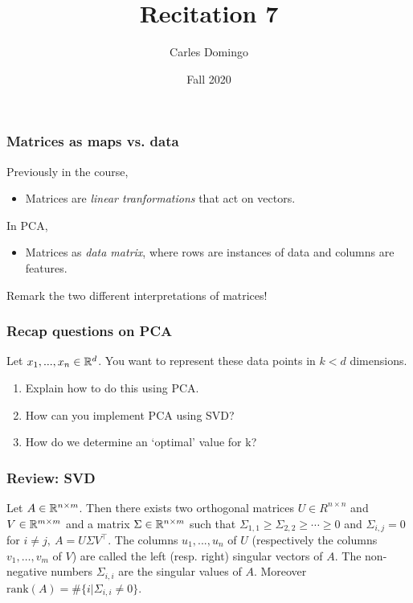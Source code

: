 \documentclass{beamer}
\title{Recitation 7}
\author{Carles Domingo}
\date{Fall 2020}
\begin{document}
\frame{\titlepage} 

\setcounter{showProgressBar}{0}
\setcounter{showSlideNumbers}{1}

\begin{frame}[t]
\frametitle{Matrices as maps vs. data}
Previously in the course,
\begin{itemize}
\item Matrices are \textit{linear tranformations} that act on vectors.
\end{itemize}
In PCA,
\begin{itemize}
\item Matrices as \textit{data matrix}, where rows are instances of data and columns are features.
\end{itemize}
Remark the two different interpretations of matrices!
\end{frame}

\begin{frame}[t]
\frametitle{Recap questions on PCA}
\vspace{-5pt}
Let $x_1,...,x_n\in\mathbb{R}^d$. You want to represent these data points in $k < d$ dimensions.
\begin{enumerate}
\item Explain how to do this using PCA.
\item How can you implement PCA using SVD?
\item How do we determine an `optimal' value for k?
\pause
\pause
\pause
\end{enumerate}
\end{frame}

\begin{frame}[t]
\frametitle{Review: SVD}
\begin{theorem}
Let $A \in \mathbb{R}^{n \times m}$. Then there exists two orthogonal matrices $U \in R^{n \times n}$ and $V \in \mathbb{R}^{m \times m}$ and a
matrix $\Sigma \in \mathbb{R}^{n \times m}$ such that $\Sigma_{1,1} \geq \Sigma_{2,2} \geq \cdots \geq 0$ and $\Sigma_{i,j} =0$ for $i \neq j, \ A = U \Sigma V^{\top}$.
The columns $u_1,...,u_n$ of $U$ (respectively the columns $v_1, \dots, v_m$ of $V$) are called the left (resp. right) singular vectors of $A$. The non-negative numbers $\Sigma_{i,i}$ are the singular values of $A$. Moreover $\text{rank}(A) = \#\{i | \Sigma_{i,i} \neq 0\}$.
\end{theorem}
\end{frame}
\end{document}
